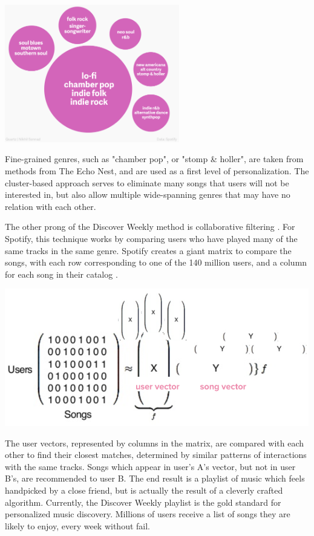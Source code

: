 \begin{center}\includegraphics[height=6cm]{images/cluster-genres.png}

\end{center} Fine-grained genres, such as "chamber pop", or "stomp \& holler", are taken from
methods from The Echo Nest, and are used as a first level of personalization. The cluster-based
approach serves to eliminate many songs that users will not be interested in, but also allow
multiple wide-spanning genres that may have no relation with each other.

The other prong of the Discover Weekly method is collaborative filtering \cite{Ciocca:17}. For
Spotify, this technique works by comparing users who have played many of the same tracks in
the same genre. Spotify creates a giant matrix to compare the songs, with each row corresponding
to one of the 140 million users, and a column for each song in their catalog \cite{Spotify:15}.
\begin{center}\includegraphics[height=6cm]{images/matrix.png}

\end{center} The user vectors, represented by columns in the matrix, are compared
with each other to find their closest matches, determined by similar patterns of
interactions with the same tracks. Songs which appear
in user's A's vector, but not in user B's, are recommended to user B. The end
result is a playlist of music which feels handpicked by a close friend, but is
actually the result of a cleverly crafted algorithm. Currently, the Discover Weekly
playlist is the gold standard for personalized music discovery. Millions of users
receive a list of songs they are likely to enjoy, every week without fail.

